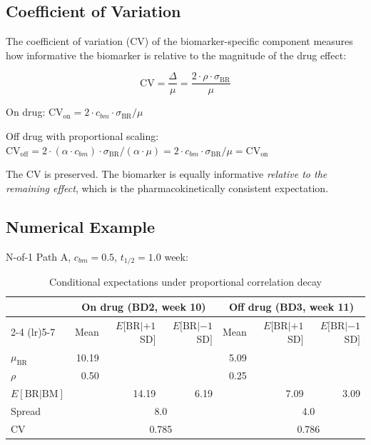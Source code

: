 \documentclass[11pt]{article}
\begin{document}
\subsection{Coefficient of Variation}

The coefficient of variation (CV) of the biomarker-specific
component measures how informative the biomarker is relative
to the magnitude of the drug effect:

\[
\text{CV} = \frac{\Delta}{\mu} =
\frac{2 \cdot \rho \cdot \sigma_{\text{BR}}}{\mu}
\]

On drug: $\text{CV}_{\text{on}} = 2 \cdot c_{bm} \cdot
\sigma_{\text{BR}} / \mu$

Off drug with proportional scaling:
$\text{CV}_{\text{off}} = 2 \cdot (\alpha \cdot c_{bm})
\cdot \sigma_{\text{BR}} / (\alpha \cdot \mu)
= 2 \cdot c_{bm} \cdot \sigma_{\text{BR}} / \mu
= \text{CV}_{\text{on}}$

The CV is preserved. The biomarker is equally informative
\emph{relative to the remaining effect}, which is the
pharmacokinetically consistent expectation.

\subsection{Numerical Example}

N-of-1 Path A, $c_{bm} = 0.5$, $t_{1/2} = 1.0$ week:

\begin{table}[h]
\centering
\caption{Conditional expectations under proportional
  correlation decay}
\begin{tabular}{lrrrrrr}
\toprule
& \multicolumn{3}{c}{On drug (BD2, week 10)} &
  \multicolumn{3}{c}{Off drug (BD3, week 11)} \\
\cmidrule(lr){2-4} \cmidrule(lr){5-7}
& Mean & $E[\text{BR}|+1$SD$]$ & $E[\text{BR}|-1$SD$]$ &
  Mean & $E[\text{BR}|+1$SD$]$ & $E[\text{BR}|-1$SD$]$ \\
\midrule
$\mu_{\text{BR}}$ & 10.19 & & & 5.09 & & \\
$\rho$ & 0.50 & & & 0.25 & & \\
$E[\text{BR}|\text{BM}]$ & & 14.19 & 6.19 & & 7.09 & 3.09 \\
Spread & & \multicolumn{2}{c}{8.0} & &
  \multicolumn{2}{c}{4.0} \\
CV & & \multicolumn{2}{c}{0.785} & &
  \multicolumn{2}{c}{0.786} \\
\bottomrule
\end{tabular}
\end{table}
\end{document}
